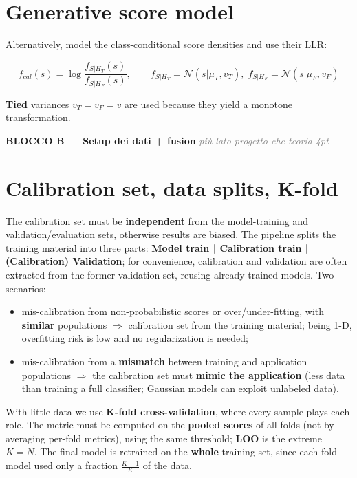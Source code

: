 \section*{Generative score model}

Alternatively, model the class-conditional score densities and use their LLR:

$$f_{cal}(s) = \log\frac{f_{S|H_T}(s)}{f_{S|H_F}(s)}, \qquad f_{S|H_T}=\mathcal{N}(s|\mu_T,v_T),\; f_{S|H_F}=\mathcal{N}(s|\mu_F,v_F)$$

\textbf{Tied} variances $v_T=v_F=v$ are used because they yield a monotone transformation.

\begin{tcolorbox}[colback=gray!8, colframe=gray!55!black, sharp corners, boxrule=1pt, left=2mm, right=2mm, top=1mm, bottom=1mm, enhanced, breakable]
\textbf{\textcolor{gray!55!black}{BLOCCO B --- Setup dei dati + fusion}} \hfill \textcolor{gray}{\footnotesize\textit{più lato-progetto che teoria 4pt}}
\end{tcolorbox}

\section*{Calibration set, data splits, K-fold}

The calibration set must be \textbf{independent} from the model-training and validation/evaluation sets, otherwise results are biased. The pipeline splits the training material into three parts: \textbf{Model train | Calibration train | (Calibration) Validation}; for convenience, calibration and validation are often extracted from the former validation set, reusing already-trained models. Two scenarios:

\begin{itemize}
\item mis-calibration from non-probabilistic scores or over/under-fitting, with \textbf{similar} populations $\Rightarrow$ calibration set from the training material; being 1-D, overfitting risk is low and no regularization is needed;
\item mis-calibration from a \textbf{mismatch} between training and application populations $\Rightarrow$ the calibration set must \textbf{mimic the application} (less data than training a full classifier; Gaussian models can exploit unlabeled data).
\end{itemize}

With little data we use \textbf{K-fold cross-validation}, where every sample plays each role. The metric must be computed on the \textbf{pooled scores} of all folds (not by averaging per-fold metrics), using the same threshold; \textbf{LOO} is the extreme $K=N$. The final model is retrained on the \textbf{whole} training set, since each fold model used only a fraction $\frac{K-1}{K}$ of the data.

